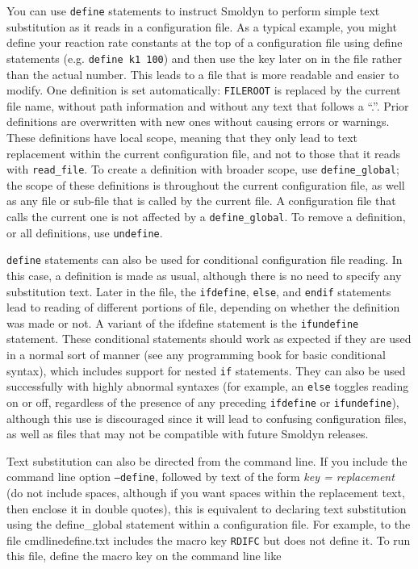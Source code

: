 \documentclass {scrbook}
\newcommand {\ttt} {\texttt}
\newcommand {\param} {\textit}
\begin{document}
You can use \ttt{define} statements to instruct Smoldyn to perform simple text substitution as it reads in a configuration file. As a typical example, you might define your reaction rate constants at the top of a configuration file using define statements (e.g. \ttt{define k1 100}) and then use the key later on in the file rather than the actual number. This leads to a file that is more readable and easier to modify. One definition is set automatically: \ttt{FILEROOT} is replaced by the current file name, without path information and without any text that follows a ``.''. Prior definitions are overwritten with new ones without causing errors or warnings. These definitions have local scope, meaning that they only lead to text replacement within the current configuration file, and not to those that it reads with \ttt{read\_file}. To create a definition with broader scope, use \ttt{define\_global}; the scope of these definitions is throughout the current configuration file, as well as any file or sub-file that is called by the current file. A configuration file that calls the current one is not affected by a \ttt{define\_global}. To remove a definition, or all definitions, use \ttt{undefine}.

\ttt{define} statements can also be used for conditional configuration file reading. In this case, a definition is made as usual, although there is no need to specify any substitution text. Later in the file, the \ttt{ifdefine}, \ttt{else}, and \ttt{endif} statements lead to reading of different portions of file, depending on whether the definition was made or not. A variant of the ifdefine statement is the \ttt{ifundefine} statement. These conditional statements should work as expected if they are used in a normal sort of manner (see any programming book for basic conditional syntax), which includes support for nested \ttt{if} statements. They can also be used successfully with highly abnormal syntaxes (for example, an \ttt{else} toggles reading on or off, regardless of the presence of any preceding \ttt{ifdefine} or \ttt{ifundefine}), although this use is discouraged since it will lead to confusing configuration files, as well as files that may not be compatible with future Smoldyn releases.

Text substitution can also be directed from the command line. If you include the command line option \ttt{--define}, followed by text of the form \param{key = replacement} (do not include spaces, although if you want spaces within the replacement text, then enclose it in double quotes), this is equivalent to declaring text substitution using the define\_global statement within a configuration file. For example, to the file cmdlinedefine.txt includes the macro key \ttt{RDIFC} but does not define it. To run this file, define the macro key on the command line like
\end{document}
